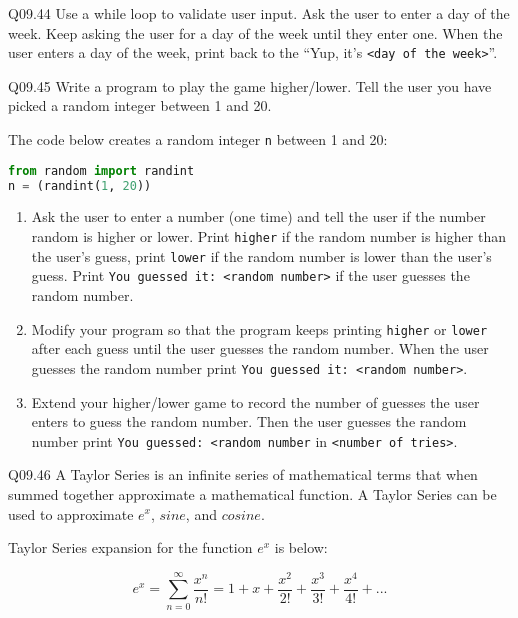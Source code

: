 \documentclass{book}
\newcommand{\passthrough}[1]{#1}
\begin{document}
Q09.44 Use a while loop to validate user input. Ask the user to enter a
day of the week. Keep asking the user for a day of the week until they
enter one. When the user enters a day of the week, print back to the
``Yup, it's \passthrough{\lstinline!<day of the week>!}''.

Q09.45 Write a program to play the game higher/lower. Tell the user you
have picked a random integer between 1 and 20.

The code below creates a random integer \passthrough{\lstinline!n!}
between 1 and 20:

\begin{lstlisting}[language=Python]
from random import randint
n = (randint(1, 20))
\end{lstlisting}

\begin{enumerate}
\def\labelenumi{(\alph{enumi})}
\item
  Ask the user to enter a number (one time) and tell the user if the
  number random is higher or lower. Print
  \passthrough{\lstinline!higher!} if the random number is higher than
  the user's guess, print \passthrough{\lstinline!lower!} if the random
  number is lower than the user's guess. Print
  \passthrough{\lstinline!You guessed it: <random number>!} if the user
  guesses the random number.
\item
  Modify your program so that the program keeps printing
  \passthrough{\lstinline!higher!} or \passthrough{\lstinline!lower!}
  after each guess until the user guesses the random number. When the
  user guesses the random number print
  \passthrough{\lstinline!You guessed it: <random number>!}.
\item
  Extend your higher/lower game to record the number of guesses the user
  enters to guess the random number. Then the user guesses the random
  number print \passthrough{\lstinline!You guessed: <random number!} in
  \passthrough{\lstinline!<number of tries>!}.
\end{enumerate}

Q09.46 A Taylor Series is an infinite series of mathematical terms that
when summed together approximate a mathematical function. A Taylor
Series can be used to approximate \(e^x\), \(sine\), and \(cosine\).

Taylor Series expansion for the function \(e^x\) is below:

\[  {e^x} = \sum\limits_{n = 0}^\infty  {\frac{{{x^n}}}{{n!}}}  = 1 + x + \frac{{{x^2}}}{{2!}} + \frac{{{x^3}}}{{3!}} + \frac{{{x^4}}}{{4!}} + ... \]
\end{document}
